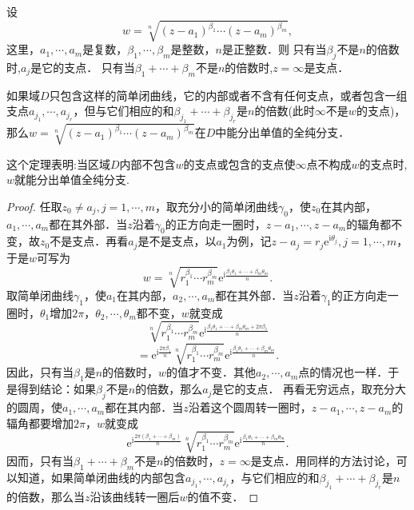 \documentclass[../../main.tex]{subfiles}%
\begin{document}
\begin{theorem}\label{theorem:多值函数分出单值全纯分支}
设
\[
w = \sqrt[n]{(z - a_1)^{\beta_1} \cdots (z - a_m)^{\beta_m}},
\]
这里，$a_1, \cdots, a_m$是复数，$\beta_1, \cdots, \beta_m$是整数，$n$是正整数．则
只有当$\beta_j$不是$n$的倍数时,$a_j$是它的支点．
只有当$\beta_1 + \cdots + \beta_m$不是$n$的倍数时,$z = \infty$是支点．

如果域$D$只包含这样的简单闭曲线，它的内部或者不含有任何支点，或者包含一组支点$a_{j_1}, \cdots, a_{j_r}$，但与它们相应的和$\beta_{j_1} + \cdots + \beta_{j_r}$是$n$的倍数(此时$\infty$不是$w$的支点)，那么$w = \sqrt[n]{(z - a_1)^{\beta_1} \cdots (z - a_m)^{\beta_m}}$在$D$中能分出单值的全纯分支．
\end{theorem}
\begin{remark}
这个定理表明:当区域$D$内部不包含$w$的支点或包含的支点使$\infty$点不构成$w$的支点时,$w$就能分出单值全纯分支.
\end{remark}
\begin{proof}

任取$z_0 \neq a_j, j = 1, \cdots, m$，取充分小的简单闭曲线$\gamma_0$，使$z_0$在其内部，$a_1, \cdots, a_m$都在其外部．当$z$沿着$\gamma_0$的正方向走一圈时，$z - a_1, \cdots, z - a_m$的辐角都不变，故$z_0$不是支点．再看$a_j$是不是支点，以$a_1$为例，记$z - a_j = r_j \text{e}^{\text{i}\theta_j}, j = 1, \cdots, m$，于是$w$可写为
\[
w = \sqrt[n]{r_1^{\beta_1} \cdots r_m^{\beta_m}} \text{e}^{\text{i}\frac{\beta_1 \theta_1 + \cdots + \beta_m \theta_m}{n}}.
\]
取简单闭曲线$\gamma_1$，使$a_1$在其内部，$a_2, \cdots, a_m$都在其外部．当$z$沿着$\gamma_1$的正方向走一圈时，$\theta_1$增加$2\pi$，$\theta_2, \cdots, \theta_m$都不变，$w$就变成
\[
\sqrt[n]{r_1^{\beta_1} \cdots r_m^{\beta_m}} \text{e}^{\text{i}\frac{\beta_1 \theta_1 + \cdots + \beta_m \theta_m + 2\pi \beta_1}{n}}
\]
\[
= \text{e}^{\text{i}\frac{2\pi \beta_1}{n}} \sqrt[n]{r_1^{\beta_1} \cdots r_m^{\beta_m}} \text{e}^{\text{i}\frac{\beta_1 \theta_1 + \cdots + \beta_m \theta_m}{n}}.
\]
因此，只有当$\beta_1$是$n$的倍数时，$w$的值才不变．其他$a_2, \cdots, a_m$点的情况也一样．于是得到结论：如果$\beta_j$不是$n$的倍数，那么$a_j$是它的支点．
再看无穷远点，取充分大的圆周，使$a_1, \cdots, a_m$都在其内部．当$z$沿着这个圆周转一圈时，$z - a_1, \cdots, z - a_m$的辐角都要增加$2\pi$，$w$就变成
\[
\text{e}^{\text{i}\frac{2\pi (\beta_1 + \cdots + \beta_m)}{n}} \sqrt[n]{r_1^{\beta_1} \cdots r_m^{\beta_m}} \text{e}^{\text{i}\frac{\beta_1 \theta_1 + \cdots + \beta_m \theta_m}{n}}.
\]
因而，只有当$\beta_1 + \cdots + \beta_m$不是$n$的倍数时，$z = \infty$是支点．用同样的方法讨论，可以知道，如果简单闭曲线的内部包含$a_{j_1}, \cdots, a_{j_r}$，与它们相应的和$\beta_{j_1} + \cdots + \beta_{j_r}$是$n$的倍数，那么当$z$沿该曲线转一圈后$w$的值不变．

\end{proof}
\end{document}

